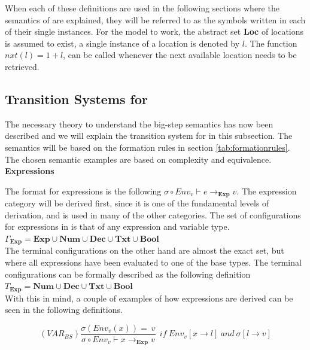 \noindent When each of these definitions are used in the following sections where the semantics of \lang are explained, they will be referred to as the symbols written in each of their single instances. For the model to work, the abstract set \textbf{Loc} of locations is assumed to exist, a single instance of a location is denoted by $l$. The function $nxt(l) = 1 + l$, can be called whenever the next available location needs to be retrieved\cite{SS_lecture_12}.

\subsection{Transition Systems for \lang} \label{TSytstem:Lang}

The necessary theory to understand the big-step semantics has now been described and we will explain the transition system for \lang in this subsection. The semantics will be based on the formation rules in section \ref{tab:formationrules}. The chosen semantic examples are based on complexity and equivalence. \\

\newpage\noindent
\textbf{Expressions}

\noindent
The format for expressions is the following $\sigma \circ Env_v \vdash e \rightarrow _{\textbf{Exp}} v$. The expression category will be derived first, since it is one of the fundamental levels of derivation, and is used in many of the other categories.  
\noindent
The set of configurations for expressions in \lang is that of any expression and variable type.
\\

\( \Gamma_{\textbf{Exp}} = \textbf{Exp} \cup \textbf{Num} \cup \textbf{Dec} \cup \textbf{Txt} \cup \textbf{Bool}  \) \\

\noindent The terminal configurations on the other hand are almost the exact set, but where all expressions have been evaluated to one of the base types. The terminal configurations can be formally described as the following definition \\

\( T_{\textbf{Exp}} = \textbf{Num} \cup \textbf{Dec} \cup \textbf{Txt} \cup \textbf{Bool} \) \\

\noindent With this in mind, a couple of examples of how expressions are derived can be seen in the following definitions.

\begin{equation}
    (VAR_{BS})\frac{\sigma(Env_v(x)) = \ v}{\sigma \circ Env_v \vdash x \rightarrow _{\textbf{Exp}} v } \ \
        if \ Env_v[x \rightarrow l] \ and \ \sigma[l \rightarrow v]
\end{equation}

